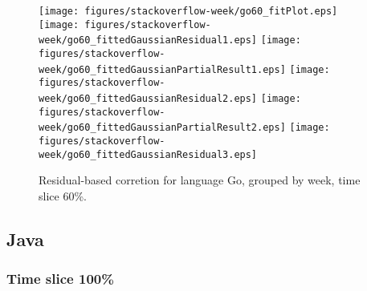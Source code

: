 \begin{figure}[hb]
\centering
{}
{\texttt{[image: figures/stackoverflow-week/go60\_fitPlot.eps]}}
{\texttt{[image: figures/stackoverflow-week/go60\_fittedGaussianResidual1.eps]}}
{\texttt{[image: figures/stackoverflow-week/go60\_fittedGaussianPartialResult1.eps]}}
{\texttt{[image: figures/stackoverflow-week/go60\_fittedGaussianResidual2.eps]}}
{\texttt{[image: figures/stackoverflow-week/go60\_fittedGaussianPartialResult2.eps]}}
{\texttt{[image: figures/stackoverflow-week/go60\_fittedGaussianResidual3.eps]}}
\caption{Residual-based corretion for language Go, grouped by week, time slice 60\%.}
\end{figure}


\clearpage 
\newpage 


\subsection{Java}

\FloatBarrier

\subsubsection{Time slice 100\%}

